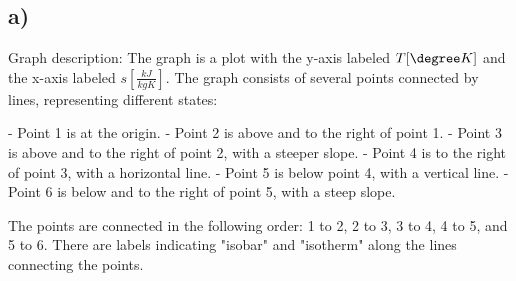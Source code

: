 

\subsection*{a)}

Graph description: The graph is a plot with the y-axis labeled $T[\degree K]$ and the x-axis labeled $s[\frac{kJ}{kgK}]$. The graph consists of several points connected by lines, representing different states:

- Point 1 is at the origin.
- Point 2 is above and to the right of point 1.
- Point 3 is above and to the right of point 2, with a steeper slope.
- Point 4 is to the right of point 3, with a horizontal line.
- Point 5 is below point 4, with a vertical line.
- Point 6 is below and to the right of point 5, with a steep slope.

The points are connected in the following order: 1 to 2, 2 to 3, 3 to 4, 4 to 5, and 5 to 6. There are labels indicating "isobar" and "isotherm" along the lines connecting the points.